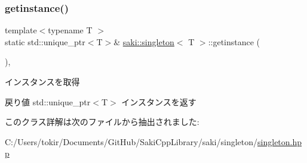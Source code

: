 \subsubsection{\texorpdfstring{getinstance()}{getinstance()}}
{\footnotesize\ttfamily template$<$typename T $>$ \\
static std\+::unique\+\_\+ptr$<$T$>$\& \mbox{\hyperlink{classsaki_1_1singleton}{saki\+::singleton}}$<$ T $>$\+::getinstance (\begin{DoxyParamCaption}{ }\end{DoxyParamCaption})\hspace{0.3cm}{\ttfamily [inline]}, {\ttfamily [static]}}



インスタンスを取得 

\begin{DoxyReturn}{戻り値}
std\+::unique\+\_\+ptr$<$\+T$>$ インスタンスを返す 
\end{DoxyReturn}


このクラス詳解は次のファイルから抽出されました\+:\begin{DoxyCompactItemize}
\item 
C\+:/\+Users/tokir/\+Documents/\+Git\+Hub/\+Saki\+Cpp\+Library/saki/singleton/\mbox{\hyperlink{singleton_2singleton_8hpp}{singleton.\+hpp}}\end{DoxyCompactItemize}

